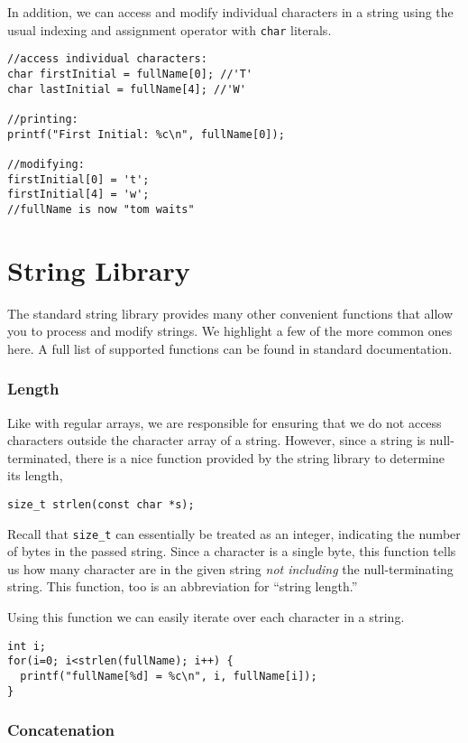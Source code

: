 In addition, we can access and modify individual characters in
a string using the usual indexing and assignment operator with
\texttt{char} literals.  

\begin{verbatim}
//access individual characters:
char firstInitial = fullName[0]; //'T'
char lastInitial = fullName[4]; //'W'

//printing:
printf("First Initial: %c\n", fullName[0]);

//modifying:
firstInitial[0] = 't';
firstInitial[4] = 'w';
//fullName is now "tom waits"
\end{verbatim}

\section{String Library}

The standard string library provides many other convenient
functions that allow you to process and modify strings.
We highlight a few of the more common ones here.  A full
list of supported functions can be found in standard 
documentation.

\subsubsection{Length}

Like with regular arrays, we are responsible for ensuring
that we do not access characters outside the character array
of a string.  However, since a string is null-terminated, 
there is a nice function provided by the string library to
determine its length, 

\texttt{size_t strlen(const char *s);}

Recall that \texttt{size_t} can essentially be
treated as an integer, indicating the number of bytes 
in the passed string.  Since a character is a single
byte, this function tells us how many character are in
the given string \emph{not including} the null-terminating
string.  This function, too is an abbreviation for
``string length.'' 

Using this function we can easily iterate over each 
character in a string.

\begin{verbatim}
int i;
for(i=0; i<strlen(fullName); i++) {
  printf("fullName[%d] = %c\n", i, fullName[i]);
}
\end{verbatim}

\subsubsection{Concatenation}

